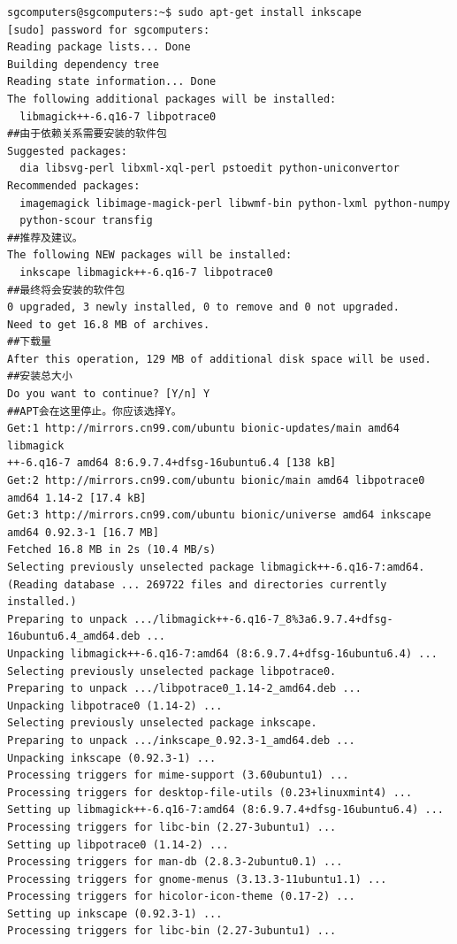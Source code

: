\begin{verbatim}
sgcomputers@sgcomputers:~$ sudo apt-get install inkscape
[sudo] password for sgcomputers: 
Reading package lists... Done
Building dependency tree       
Reading state information... Done
The following additional packages will be installed:
  libmagick++-6.q16-7 libpotrace0
##由于依赖关系需要安装的软件包
Suggested packages:
  dia libsvg-perl libxml-xql-perl pstoedit python-uniconvertor
Recommended packages:
  imagemagick libimage-magick-perl libwmf-bin python-lxml python-numpy
  python-scour transfig
##推荐及建议。
The following NEW packages will be installed:
  inkscape libmagick++-6.q16-7 libpotrace0
##最终将会安装的软件包
0 upgraded, 3 newly installed, 0 to remove and 0 not upgraded.
Need to get 16.8 MB of archives.
##下载量
After this operation, 129 MB of additional disk space will be used.
##安装总大小
Do you want to continue? [Y/n] Y
##APT会在这里停止。你应该选择Y。
Get:1 http://mirrors.cn99.com/ubuntu bionic-updates/main amd64 libmagick
++-6.q16-7 amd64 8:6.9.7.4+dfsg-16ubuntu6.4 [138 kB]
Get:2 http://mirrors.cn99.com/ubuntu bionic/main amd64 libpotrace0 amd64 1.14-2 [17.4 kB]
Get:3 http://mirrors.cn99.com/ubuntu bionic/universe amd64 inkscape amd64 0.92.3-1 [16.7 MB]
Fetched 16.8 MB in 2s (10.4 MB/s)    
Selecting previously unselected package libmagick++-6.q16-7:amd64.
(Reading database ... 269722 files and directories currently installed.)
Preparing to unpack .../libmagick++-6.q16-7_8%3a6.9.7.4+dfsg-16ubuntu6.4_amd64.deb ...
Unpacking libmagick++-6.q16-7:amd64 (8:6.9.7.4+dfsg-16ubuntu6.4) ...
Selecting previously unselected package libpotrace0.
Preparing to unpack .../libpotrace0_1.14-2_amd64.deb ...
Unpacking libpotrace0 (1.14-2) ...
Selecting previously unselected package inkscape.
Preparing to unpack .../inkscape_0.92.3-1_amd64.deb ...
Unpacking inkscape (0.92.3-1) ...
Processing triggers for mime-support (3.60ubuntu1) ...
Processing triggers for desktop-file-utils (0.23+linuxmint4) ...
Setting up libmagick++-6.q16-7:amd64 (8:6.9.7.4+dfsg-16ubuntu6.4) ...
Processing triggers for libc-bin (2.27-3ubuntu1) ...
Setting up libpotrace0 (1.14-2) ...
Processing triggers for man-db (2.8.3-2ubuntu0.1) ...
Processing triggers for gnome-menus (3.13.3-11ubuntu1.1) ...
Processing triggers for hicolor-icon-theme (0.17-2) ...
Setting up inkscape (0.92.3-1) ...
Processing triggers for libc-bin (2.27-3ubuntu1) ...
\end{verbatim}
